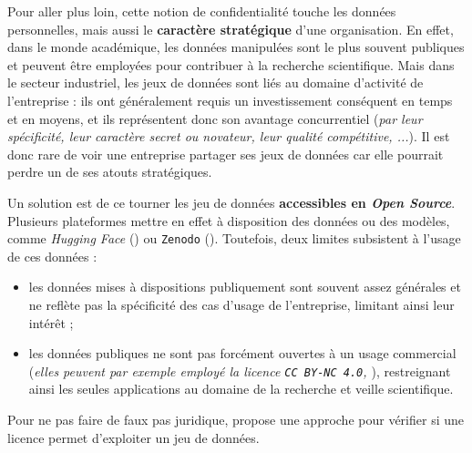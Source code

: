 			Pour aller plus loin, cette notion de confidentialité touche les données personnelles, mais aussi le \textbf{caractère stratégique} d'une organisation.
			En effet, dans le monde académique, les données manipulées sont le plus souvent publiques et peuvent être employées pour contribuer à la recherche scientifique.
			Mais dans le secteur industriel, les jeux de données sont liés au domaine d'activité de l'entreprise : ils ont généralement requis un investissement conséquent en temps et en moyens, et ils représentent donc son avantage concurrentiel (\textit{par leur spécificité, leur caractère secret ou novateur, leur qualité compétitive, ...}).
			Il est donc rare de voir une entreprise partager ses jeux de données car elle pourrait perdre un de ses atouts stratégiques.
			
			Un solution est de ce tourner les jeu de données \textbf{accessibles en \textit{Open Source}}.
			Plusieurs plateformes mettre en effet à disposition des données ou des modèles, comme \textit{Hugging Face} (\cite{hugging-face:2016:hugging-face-ai}) ou \texttt{Zenodo} (\cite{re3data.org:2013:zenodo}).
			Toutefois, deux limites subsistent à l'usage de ces données :
			\begin{itemize}
				\item les données mises à dispositions publiquement sont souvent assez générales et ne reflète pas la spécificité des cas d'usage de l'entreprise, limitant ainsi leur intérêt ;
				\item les données publiques ne sont pas forcément ouvertes à un usage commercial (\textit{elles peuvent par exemple employé la licence \texttt{CC BY-NC 4.0}, \cite{creative-commons:2013:cc-bync-legal}}), restreignant ainsi les seules applications au domaine de la recherche et veille scientifique.
			\end{itemize}
			Pour ne pas faire de faux pas juridique, \cite{rajbahadur-etal:2022:can-use-this} propose une approche pour vérifier si une licence permet d'exploiter un jeu de données.
			
